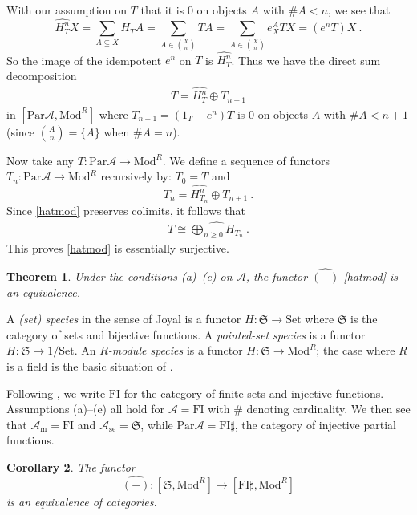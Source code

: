 \documentclass[a4paper,12pt,reqno]{amsart}
\newtheorem{theorem}{Theorem}[section] %
\newtheorem{corollary}[theorem]{Corollary}
\theoremstyle{definition}
\theoremstyle{fact}
\theoremstyle{genquest}
\theoremstyle{step}
\newcommand{\lra}{\longrightarrow}
\def\CA{{\mathscr A}}
\begin{document}
With our assumption on $T$ that it is $0$ on objects $A$ with $\#A<n$, we see that
$$\widehat{H^n_T}X = \sum_{A\subseteq X}{H_TA}= \sum_{A\in \binom{X}{n}}{TA} =\sum_{A\in \binom{X}{n}}{e_X^ATX} = (e^nT)X \ .$$
So the image of the idempotent $e^n$ on $T$ is $\widehat{H^n_T}$.
Thus we have the direct sum decomposition 
\begin{eqnarray}
T = \widehat{H^n_T} \oplus T_{n+1}
\end{eqnarray}
in $[\mathrm{Par}\CA,\mathrm{Mod}^R]$ where $T_{n+1} = (1_T-e^n)T$ is $0$ on objects $A$ with $\#A<n+1$ (since $\binom{A}{n} = \{A\}$ when $\#A = n$).

Now take any $T: \mathrm{Par}\CA \lra \mathrm{Mod}^R$. 
We define a sequence of functors $T_n : \mathrm{Par}\CA \lra \mathrm{Mod}^R$ 
recursively by: $T_0 = T$ and $$T_n = \widehat{H^n_{T_n}} \oplus T_{n+1} \ .$$
Since \eqref{hatmod} preserves colimits, it follows that 
\begin{eqnarray}
T \cong \widehat{\bigoplus_{n\geq 0}{H_{T_n}}} \ .
\end{eqnarray}
This proves \eqref{hatmod} is essentially surjective. 

\begin{theorem}
Under the conditions (a)--(e) on $\CA$, the functor $\widehat{(-)}$ \eqref{hatmod} is an equivalence. 
\end{theorem} 

A {\em (set) species} in the sense of Joyal \cite{Species} is a functor 
$H : \mathfrak{S} \lra \mathrm{Set}$
where $\mathfrak{S}$ is the category of sets and bijective functions. 
A {\em pointed-set species} is a functor 
$H : \mathfrak{S} \lra 1/\mathrm{Set}$.
An {\em $R$-module species} is a functor 
$H : \mathfrak{S} \lra \mathrm{Mod}^R$; the case where $R$ is
a field is the basic situation of \cite{AnalFunct}.

Following \cite{CEF2012}, we write $\mathrm{FI}$ for the category of finite sets
and injective functions. Assumptions (a)--(e) all hold for $\CA = \mathrm{FI}$ with $\#$ denoting cardinality. We then see that 
$\CA_{\mathrm{m}} = \mathrm{FI}$ and $\CA_{\mathrm{se}} = \mathfrak{S}$,
while $\mathrm{Par}\CA = \mathrm{FI}\sharp$, the category of injective partial functions.  

\begin{corollary} \cite{CEF2012} The functor
$$\widehat{(-)} : [\mathfrak{S}, \mathrm{Mod}^R] \lra [\mathrm{FI}\sharp, \mathrm{Mod}^R]$$
is an equivalence of categories.
\end{corollary}
\end{document}
